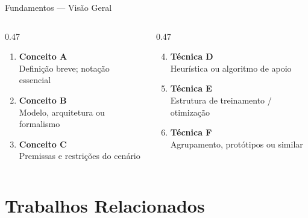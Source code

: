 \documentclass[aspectratio=169, 10pt, brazil]{beamer}
\begin{document}
\begin{frame}{Fundamentos — Visão Geral}
  \begin{columns}[T]
    \begin{column}{0.47\textwidth}
      \begin{enumerate}
        \item \textbf{Conceito A}\\
              \small Definição breve; notação essencial
        \item \textbf{Conceito B}\\
              \small Modelo, arquitetura ou formalismo
        \item \textbf{Conceito C}\\
              \small Premissas e restrições do cenário
      \end{enumerate}
    \end{column}
    \begin{column}{0.47\textwidth}
      \begin{enumerate}\setcounter{enumi}{3}
        \item \textbf{Técnica D}\\
              \small Heurística ou algoritmo de apoio
        \item \textbf{Técnica E}\\
              \small Estrutura de treinamento / otimização
        \item \textbf{Técnica F}\\
              \small Agrupamento, protótipos ou similar
      \end{enumerate}
    \end{column}
  \end{columns}
\end{frame}

\section{Trabalhos Relacionados}
\end{document}
